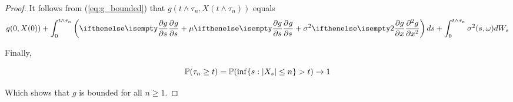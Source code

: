 \documentclass[../TGMAFFIRO.tex]{subfiles}
\begin{document}
\begin{proposition}
\begin{proof}
It follows from (\ref{eq:g_bounded}) that $g(t\wedge\tau_n, X(t\wedge\tau_n))$ equals
\begin{equation}
  g(0, X(0)) + \int_0^{t\wedge\tau_n} \left(\partialwrt{g}{s} + \mu\partialwrt{g}{s} + \sigma^2\partialwrt[2]{g}{x}\right) ds + \int_0^{t\wedge\tau_n}\sigma^2(s, \omega) dW_s
\end{equation}

Finally,

\begin{equation}
  \mathbb{P}(\tau_n \geq t) = 	\mathbb{P}(\inf	\{s: |X_s| \leq n\} > t) \to 1
\end{equation}

Which shows that $g$ is bounded for all $n \geq 1$.
\end{proof}
\end{proposition}
\end{document}
